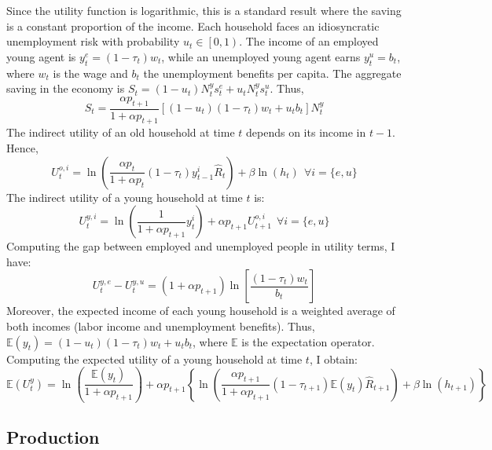 Since the utility function is logarithmic, this is a standard result where the saving is a constant proportion of the income.
Each household faces an idiosyncratic unemployment risk with probability $u_t \in \left[0,1\right)$. The income of an employed young agent is $y^e_t = (1-\tau_t)w_t$, while an unemployed young agent earns $y^u_t = b_t$, where $w_t$ is the wage and $b_t$ the unemployment benefits per capita. The aggregate saving in the economy is $S_t = (1-u_t) N_t^y s^e_t + u_t N_t^y s^u_t$. Thus,
	\begin{equation}\label{eq:agg_saving}
		S_t = \frac{\alpha p_{t+1}}{1+\alpha p_{t+1}}\left[ (1-u_t)(1-\tau_t)w_t + u_t b_t \right] N_t^y
	\end{equation}
The indirect utility of an old household at time $t$ depends on its income in $t-1$. Hence,
	\begin{equation}\label{eq:utility_old}
		U_t^{o,i} = \ln\left(\frac{\alpha p_t}{1+\alpha p_t}(1-\tau_t)y_{t-1}^i\hat{R}_t\right) + \beta \ln(h_t) ~~ \forall i = \lbrace e,u \rbrace
	\end{equation}
The indirect utility of a young household at time $t$ is:
	\begin{equation*}\label{eq:utility_young}
		U_t^{y,i} = \ln\left(\frac{1}{1+\alpha p_{t+1}}y_t^i\right)+ \alpha p_{t+1} U_{t+1}^{o,i} ~~ \forall i = \lbrace e,u \rbrace
	\end{equation*}
Computing the gap between employed and unemployed people in utility terms, I have:
	\begin{equation}\label{eq:utility_young_gap}
		U_t^{y,e} - U_t^{y,u} = (1+\alpha p_{t+1})\ln\left[\frac{(1-\tau_t)w_t}{b_t}\right]
	\end{equation}
Moreover, the expected income of each young household is a weighted average of both incomes (labor income and unemployment benefits). Thus, $\mathbb{E}(y_t) = (1-u_t)(1-\tau_t)w_t + u_tb_t$, where $\mathbb{E}$ is the expectation operator. Computing the expected utility of a young household at time $t$, I obtain:
	\begin{equation}\label{eq:expected_utility_young}
		\mathbb{E}({U}_t^y) = \ln\left(\frac{\mathbb{E}\left(y_t\right)}{1+\alpha p_{t+1}}\right) + \alpha p_{t+1}\left\lbrace \ln\left(\frac{\alpha p_{t+1}}{1+\alpha p_{t+1}}(1-\tau_{t+1})\mathbb{E}(y_t)\hat{R}_{t+1}\right) + \beta \ln(h_{t+1}) \right\rbrace
	\end{equation}


\subsection{Production}

